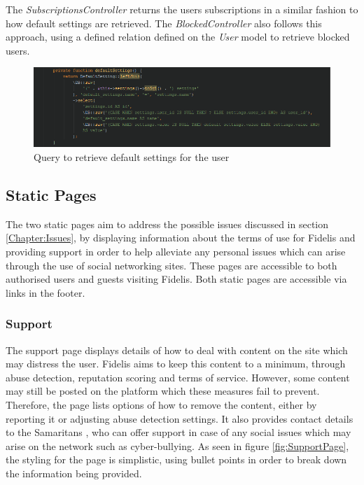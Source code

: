 The \textit{SubscriptionsController} returns the users subscriptions in a similar fashion to how default settings are retrieved. The \textit{BlockedController} also follows this approach, using a defined relation defined on the \emph{User} model to retrieve blocked users.

\begin{figure}[H]
\centering
\includegraphics[width=\textwidth]{Images/Implementation/UserDefaultSettings}
\caption{Query to retrieve default settings for the user}
\label{fig:UserDefaultSettings}
\end{figure}

\subsection{Static Pages}
The two static pages aim to address the possible issues discussed in section \ref{Chapter:Issues}, by displaying information about the terms of use for Fidelis and providing support in order to help alleviate any personal issues which can arise through the use of social networking sites. These pages are accessible to both authorised users and guests visiting Fidelis. Both static pages are accessible via links in the footer.

\subsubsection{Support}
The support page displays details of how to deal with content on the site which may distress the user. Fidelis aims to keep this content to a minimum, through abuse detection, reputation scoring and terms of service. However, some content may still be posted on the platform which these measures fail to prevent. Therefore, the page lists options of how to remove the content, either by reporting it or adjusting abuse detection settings. It also provides contact details to the Samaritans \cite{Samaritans:Home}, who can offer support in case of any social issues which may arise on the network such as cyber-bullying. As seen in figure \ref{fig:SupportPage}, the styling for the page is simplistic, using bullet points in order to break down the information being provided.

